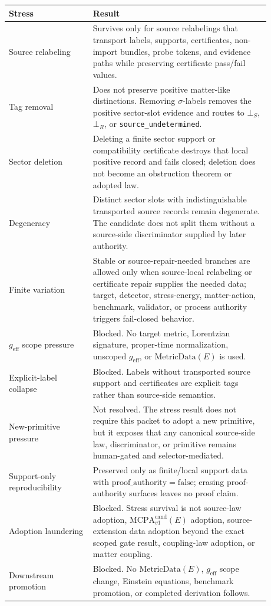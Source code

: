 \documentclass[11pt]{article}
\newcommand{\MetricData}{\mathrm{MetricData}}
\newcommand{\geff}{g_{\mathrm{eff}}}
\newcommand{\MCPA}{\mathrm{MCPA}^{\mathrm{cand}}_{v1}}
\newcommand{\BottomS}{\bot_S}
\newcommand{\BottomR}{\bot_R}
\newcommand{\ProofAuthFalse}{\mathrm{proof\_authority=false}}
\begin{document}
\begin{longtable}{p{0.29\linewidth}p{0.59\linewidth}}
\toprule
Stress & Result \\
\midrule
Source relabeling & Survives only for source relabelings that transport
labels, supports, certificates, non-import bundles, probe tokens, and evidence
paths while preserving certificate pass/fail values. \\
Tag removal & Does not preserve positive matter-like distinctions. Removing
\(\sigma\)-labels removes the positive sector-slot evidence and routes to
\(\BottomS\), \(\BottomR\), or \texttt{source\_undetermined}. \\
Sector deletion & Deleting a finite sector support or compatibility
certificate destroys that local positive record and fails closed; deletion does
not become an obstruction theorem or adopted law. \\
Degeneracy & Distinct sector slots with indistinguishable transported source
records remain degenerate. The candidate does not split them without a
source-side discriminator supplied by later authority. \\
Finite variation & Stable or source-repair-needed branches are allowed only
when source-local relabeling or certificate repair supplies the needed data;
target, detector, stress-energy, matter-action, benchmark, validator, or
process authority triggers fail-closed behavior. \\
\(\geff\) scope pressure & Blocked. No target metric, Lorentzian signature,
proper-time normalization, unscoped \(\geff\), or \(\MetricData(E)\) is used. \\
Explicit-label collapse & Blocked. Labels without transported source support
and certificates are explicit tags rather than source-side semantics. \\
New-primitive pressure & Not resolved. The stress result does not require this
packet to adopt a new primitive, but it exposes that any canonical source-side
law, discriminator, or primitive remains human-gated and selector-mediated. \\
Support-only reproducibility & Preserved only as finite/local support data with
\(\ProofAuthFalse\); erasing proof-authority surfaces leaves no proof claim. \\
Adoption laundering & Blocked. Stress survival is not source-law adoption,
\(\MCPA(E)\) adoption, source-extension data adoption beyond the exact scoped
gate result, coupling-law adoption, or matter coupling. \\
Downstream promotion & Blocked. No \(\MetricData(E)\), \(\geff\) scope change,
Einstein equations, benchmark promotion, or completed derivation follows. \\
\bottomrule
\end{longtable}
\end{document}
